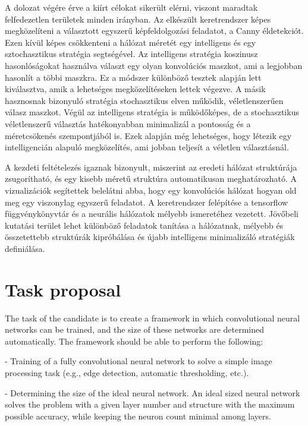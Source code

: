 \documentclass[12pt]{report}
\begin{document}
A dolozat végére érve a kiírt célokat sikerült elérni, viszont maradtak felfedezetlen területek minden irányban. Az elkészült keretrendszer képes megközelíteni a választott egyszerű képfeldolgozási feladatot, a Canny éldetekciót. Ezen kívül képes csökkenteni a hálózat méretét egy intelligens és egy sztochasztikus stratégia segtségével. Az intelligens stratégia koszinusz hasonlóságokat használva választ egy olyan konvolúciós maszkot, ami a legjobban hasonlít a többi maszkra. Ez a módszer különböző tesztek alapján lett kiválasztva, amik a lehetséges megközelítéseken lettek végezve. A másik hasznosnak bizonyuló stratégia stochasztikus elven működik, véletlenszerűen válasz maszkot. Végül az intelligens stratégia is működőképes, de a stochasztikus véletlenszerű választás hatékonyabban minimalizál a pontosság és a méretcsökenés szempontjából is. Ezek alapján még lehetséges, hogy létezik egy intelligencián alapuló megközelítés, ami jobban teljesít a véletlen választásnál.

A kezdeti feltételezés igaznak bizonyult, miszerint az eredeti hálózat struktúrája zsugorítható, és egy kisebb méretű struktúra automatikusan meghatározható. A vizualizációk segítettek belelátni abba, hogy egy konvolúciós hálózat hogyan old meg egy viszonylag egyszerű feladatot. A keretrendszer felépítése a tensorflow függvénykönyvtár és a neurális hálózatok mélyebb ismeretéhez vezetett. Jövőbeli kutatási terület lehet különböző feladatok tanítása a hálózatnak, mélyebb és összetettebb struktúrák kipróbálása és újabb intelligens minimalizáló stratégiák definiálása.

\chapter*{Task proposal}

The task of the candidate is to create a framework in which convolutional neural networks can be trained, and the size of these networks are determined automatically. The framework should be able to perform the following:

- Training of a fully convolutional neural network to solve a simple image processing task (e.g., edge detection, automatic thresholding, etc.).

- Determining the size of the ideal neural network. An ideal sized neural network solves the problem with a given layer number and structure with the maximum possible accuracy, while keeping the neuron count minimal among layers.
\end{document}
